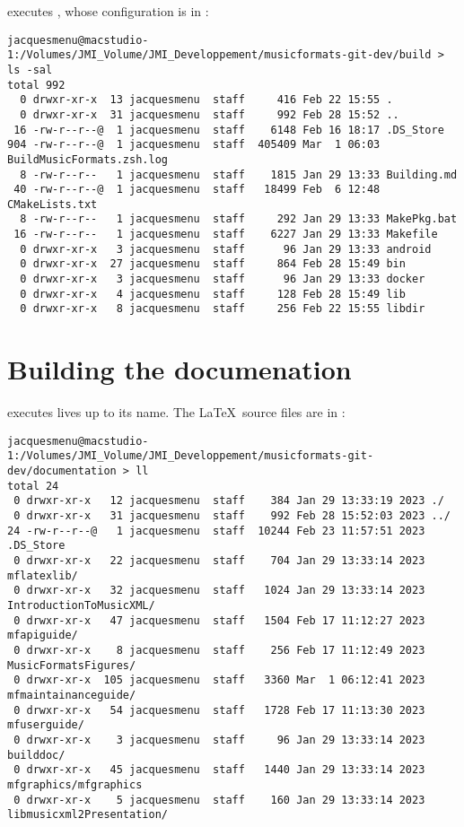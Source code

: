  executes \cmake, whose configuration is in \buildFolder:
\begin{lstlisting}[language=Terminal]
jacquesmenu@macstudio-1:/Volumes/JMI_Volume/JMI_Developpement/musicformats-git-dev/build > ls -sal
total 992
  0 drwxr-xr-x  13 jacquesmenu  staff     416 Feb 22 15:55 .
  0 drwxr-xr-x  31 jacquesmenu  staff     992 Feb 28 15:52 ..
 16 -rw-r--r--@  1 jacquesmenu  staff    6148 Feb 16 18:17 .DS_Store
904 -rw-r--r--@  1 jacquesmenu  staff  405409 Mar  1 06:03 BuildMusicFormats.zsh.log
  8 -rw-r--r--   1 jacquesmenu  staff    1815 Jan 29 13:33 Building.md
 40 -rw-r--r--@  1 jacquesmenu  staff   18499 Feb  6 12:48 CMakeLists.txt
  8 -rw-r--r--   1 jacquesmenu  staff     292 Jan 29 13:33 MakePkg.bat
 16 -rw-r--r--   1 jacquesmenu  staff    6227 Jan 29 13:33 Makefile
  0 drwxr-xr-x   3 jacquesmenu  staff      96 Jan 29 13:33 android
  0 drwxr-xr-x  27 jacquesmenu  staff     864 Feb 28 15:49 bin
  0 drwxr-xr-x   3 jacquesmenu  staff      96 Jan 29 13:33 docker
  0 drwxr-xr-x   4 jacquesmenu  staff     128 Feb 28 15:49 lib
  0 drwxr-xr-x   8 jacquesmenu  staff     256 Feb 22 15:55 libdir
\end{lstlisting}


\section{Building the documenation}

 executes lives up to its name. The \LaTeX\ source files are in \docFolder:
\begin{lstlisting}[language=Terminal]
jacquesmenu@macstudio-1:/Volumes/JMI_Volume/JMI_Developpement/musicformats-git-dev/documentation > ll
total 24
 0 drwxr-xr-x   12 jacquesmenu  staff    384 Jan 29 13:33:19 2023 ./
 0 drwxr-xr-x   31 jacquesmenu  staff    992 Feb 28 15:52:03 2023 ../
24 -rw-r--r--@   1 jacquesmenu  staff  10244 Feb 23 11:57:51 2023 .DS_Store
 0 drwxr-xr-x   22 jacquesmenu  staff    704 Jan 29 13:33:14 2023 mflatexlib/
 0 drwxr-xr-x   32 jacquesmenu  staff   1024 Jan 29 13:33:14 2023 IntroductionToMusicXML/
 0 drwxr-xr-x   47 jacquesmenu  staff   1504 Feb 17 11:12:27 2023 mfapiguide/
 0 drwxr-xr-x    8 jacquesmenu  staff    256 Feb 17 11:12:49 2023 MusicFormatsFigures/
 0 drwxr-xr-x  105 jacquesmenu  staff   3360 Mar  1 06:12:41 2023 mfmaintainanceguide/
 0 drwxr-xr-x   54 jacquesmenu  staff   1728 Feb 17 11:13:30 2023 mfuserguide/
 0 drwxr-xr-x    3 jacquesmenu  staff     96 Jan 29 13:33:14 2023 builddoc/
 0 drwxr-xr-x   45 jacquesmenu  staff   1440 Jan 29 13:33:14 2023 mfgraphics/mfgraphics
 0 drwxr-xr-x    5 jacquesmenu  staff    160 Jan 29 13:33:14 2023 libmusicxml2Presentation/
\end{lstlisting}

